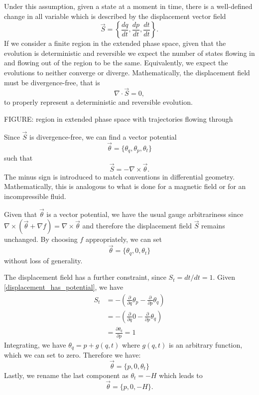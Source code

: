 \documentclass[10pt,twocolumn, nofootinbib]{revtex4-2}
\begin{document}
Under this assumption, given a state at a moment in time, there is a well-defined change in all variable which is described by the displacement vector field
\begin{equation}
	\vec{S} = \left\{ \frac{dq}{dt},\frac{dp}{dt},\frac{dt}{dt} \right\}.
\end{equation}
If we consider a finite region in the extended phase space, given that the evolution is deterministic and reversible we expect the number of states flowing in and flowing out of the region to be the same. Equivalently, we expect the evolutions to neither converge or diverge. Mathematically, the displacement field must be divergence-free, that is
\begin{equation}
	\nabla \cdot \vec{S} = 0,
\end{equation}
to properly represent a deterministic and reversible evolution.

FIGURE: region in extended phase space with trajectories flowing through

Since $\vec{S}$ is divergence-free, we can find a vector potential
\begin{equation}
	\vec{\theta} = \{\theta_q, \theta_p, \theta_t\}
\end{equation}
such that
\begin{equation}\label{displacement_has_potential}
	\vec{S} = - \nabla \times \vec{\theta}.
\end{equation}
The minus sign is introduced to match conventions in differential geometry. Mathematically, this is analogous to what is done for a magnetic field or for an incompressible fluid.

Given that $\vec{\theta}$ is a vector potential, we have the usual gauge arbitrariness since $\nabla \times(\vec{\theta} + \nabla f) = \nabla \times \vec{\theta}$ and therefore the displacement field $\vec{S}$ remains unchanged. By choosing $f$ appropriately, we can set
\begin{equation}
	\vec{\theta} = \{\theta_q, 0, \theta_t\}
\end{equation}
without loss of generality.

The displacement field has a further constraint, since $S_t = dt/ dt = 1$. Given \ref{displacement_has_potential}, we have
\begin{align*}
	S_t &= - \left(\frac{\partial}{\partial q}  \theta_p - \frac{\partial}{\partial p}  \theta_q\right) \\
	&= - \left(\frac{\partial}{\partial q}  0 - \frac{\partial}{\partial p}  \theta_q\right) \\
	& = \frac{\partial \theta_q}{\partial p} = 1
\end{align*}
Integrating, we have $\theta_q = p + g(q,t)$ where $g(q,t)$ is an arbitrary function, which we can set to zero. Therefore we have:
\begin{equation}
	\vec{\theta} = \{p, 0, \theta_t\}
\end{equation}
Lastly, we rename the last component as $\theta_t = -H$ which leads to 
\begin{equation}\label{potential_final}
	\vec{\theta} = \{p, 0, -H\}.
\end{equation}
\end{document}
